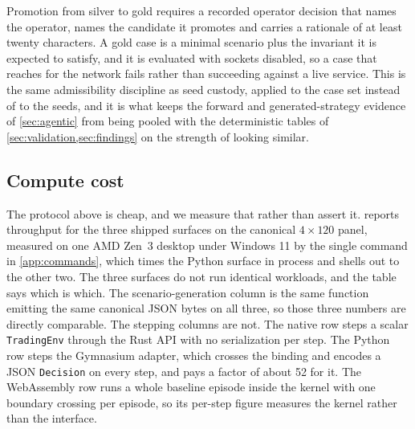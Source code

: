 Promotion from silver to gold requires a recorded operator decision that names the operator, names the candidate it promotes and carries a rationale of at least twenty characters. A gold case is a minimal scenario plus the invariant it is expected to satisfy, and it is evaluated with sockets disabled, so a case that reaches for the network fails rather than succeeding against a live service. This is the same admissibility discipline as seed custody, applied to the case set instead of to the seeds, and it is what keeps the forward and generated-strategy evidence of \cref{sec:agentic} from being pooled with the deterministic tables of \cref{sec:validation,sec:findings} on the strength of looking similar.

\subsection{Compute cost}\label{sec:protocol-compute}

The protocol above is cheap, and we measure that rather than assert it.  reports throughput for the three shipped surfaces on the canonical $4 \times 120$ panel, measured on one AMD Zen~3 desktop under Windows 11 by the single command in \cref{app:commands}, which times the Python surface in process and shells out to the other two. The three surfaces do not run identical workloads, and the table says which is which. The scenario-generation column is the same function emitting the same canonical JSON bytes on all three, so those three numbers are directly comparable. The stepping columns are not. The native row steps a scalar \texttt{TradingEnv} through the Rust API with no serialization per step. The Python row steps the Gymnasium adapter, which crosses the binding and encodes a JSON \texttt{Decision} on every step, and pays a factor of about 52 for it. The WebAssembly row runs a whole baseline episode inside the kernel with one boundary crossing per episode, so its per-step figure measures the kernel rather than the interface.

